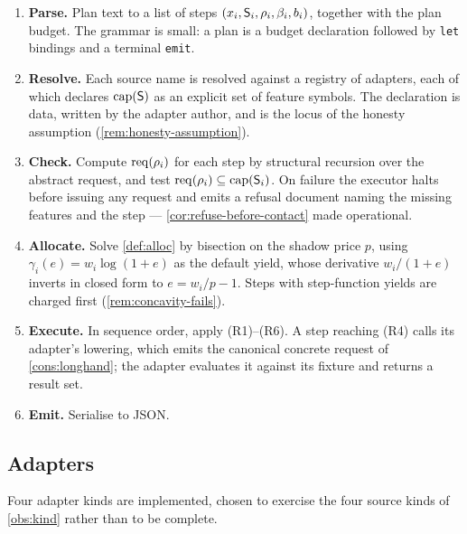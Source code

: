 \begin{enumerate}[label=(\arabic*),leftmargin=2.4em]
\item \textbf{Parse.} Plan text to a list of steps
$(x_i, \mathsf{S}_i, \rho_i, \beta_i, b_i)$, together with the plan budget. The
grammar is small: a plan is a budget declaration followed by \texttt{let}
bindings and a terminal \texttt{emit}.
\item \textbf{Resolve.} Each source name is resolved against a registry of
adapters, each of which declares $\mathrm{cap}(\mathsf{S})$ as an explicit set of feature
symbols. The declaration is data, written by the adapter author, and is the
locus of the honesty assumption (\cref{rem:honesty-assumption}).
\item \textbf{Check.} Compute $\mathrm{req}(\rho_i)$ for each step by structural
recursion over the abstract request, and test
$\mathrm{req}(\rho_i) \subseteq \mathrm{cap}(\mathsf{S}_i)$. On failure the executor halts before
issuing any request and emits a refusal document naming the missing features
and the step --- \cref{cor:refuse-before-contact} made operational.
\item \textbf{Allocate.} Solve \cref{def:alloc} by bisection on the shadow price
$p$, using $\gamma_i(e) = w_i \log(1 + e)$ as the default yield, whose
derivative $w_i/(1+e)$ inverts in closed form to
$e = w_i/p - 1$. Steps with step-function yields are charged first
(\cref{rem:concavity-fails}).
\item \textbf{Execute.} In sequence order, apply (R1)--(R6). A step reaching
(R4) calls its adapter's lowering, which emits the canonical concrete request of
\cref{cons:longhand}; the adapter evaluates it against its fixture and returns a
result set.
\item \textbf{Emit.} Serialise to JSON.
\end{enumerate}

\subsection{Adapters}

Four adapter kinds are implemented, chosen to exercise the four source kinds of
\cref{obs:kind} rather than to be complete.

